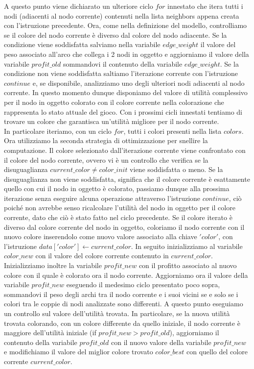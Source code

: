 A questo punto viene dichiarato un ulteriore ciclo $for$ innestato che itera tutti i nodi (adiacenti al nodo corrente) contenuti nella lista neighbors appena creata con l'istruzione precedente. Ora, come nella definizione del modello, controlliamo se il colore del nodo corrente è diverso dal colore del nodo adiacente. Se la condizione viene soddisfatta salviamo nella variabile $edge\_weight$ il valore del peso associato all'arco che collega i 2 nodi in oggetto e aggiorniamo il valore della variabile $profit\_old$ sommandovi il contenuto della variabile $edge\_weight$. Se la condizione non viene soddisfatta saltiamo l'iterazione corrente con l'istruzione $continue$ e, se disponibile, analizziamo uno degli ulteriori nodi adiacenti al nodo corrente. In questo momento dunque disponiamo del valore di utilità complessivo per il nodo in oggetto colorato con il colore corrente nella colorazione che rappresenta lo stato attuale del gioco. Con i prossimi cicli innestati tentiamo di trovare un colore che garantisca un'utilità migliore per il nodo corrente.\\
In particolare iteriamo, con un ciclo $for$, tutti i colori presenti nella lista $colors$. Ora utilizziamo la seconda strategia di ottimizzazione per snellire la computazione. Il colore selezionato dall'iterazione corrente viene confrontato con il colore del nodo corrente, ovvero vi è un controllo che verifica se la disuguaglianza $current\_color \neq color\_init$ viene soddisfatta o meno. Se la disuguaglianza non viene soddisfatta, significa che il colore corrente è esattamente quello con cui il nodo in oggetto è colorato, passiamo dunque alla prossima iterazione senza eseguire alcuna operazione attraverso l'istruzione $continue$, ciò poiché non avrebbe senso ricalcolare l'utilità del nodo in oggetto per il colore corrente, dato che ciò è stato fatto nel ciclo precedente. Se il colore iterato è diverso dal colore corrente del nodo in oggetto, coloriamo il nodo corrente con il nuovo colore inserendolo come nuovo valore associato alla chiave $'color'$, con l'istruzione $data['color']\gets current\_color$. In seguito inizializziamo al variabile $color\_new$ con il valore del colore corrente contenuto in $current\_color$. Inizializziamo inoltre la variabile $profit\_new$ con il profitto associato al nuovo colore con il quale è colorato ora il nodo corrente. Aggiorniamo ora il valore della variabile $profit\_new$ eseguendo il medesimo ciclo presentato poco sopra, sommandovi il peso degli archi tra il nodo corrente e i suoi vicini se e solo se i colori tra le coppie di nodi analizzate sono differenti. A questo punto eseguiamo un controllo sul valore dell'utilità trovata. In particolare, se la nuova utilità trovata colorando, con un colore differente da quello iniziale, il nodo corrente è maggiore dell'utilità iniziale (if $profit\_new > profit\_old$), aggiorniamo il contenuto della variabile $profit\_old$ con il nuovo valore della variabile $profit\_new$ e modifichiamo il valore del miglior colore trovato $color\_best$ con quello del colore corrente $current\_color$.\\

